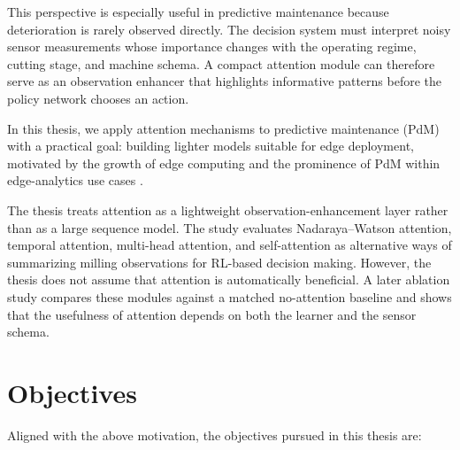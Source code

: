 \documentclass[12pt,oneside]{book}
\begin{document}
This perspective is especially useful in predictive maintenance because deterioration is rarely observed directly. The decision system must interpret noisy sensor measurements whose importance changes with the operating regime, cutting stage, and machine schema. A compact attention module can therefore serve as an observation enhancer that highlights informative patterns before the policy network chooses an action.

In this thesis, we apply attention mechanisms to predictive maintenance (PdM) with a practical goal: building lighter models suitable for edge deployment, motivated by the growth of edge computing and the prominence of PdM within edge-analytics use cases \citep{edgereport2023}.

The thesis treats attention as a lightweight observation-enhancement layer rather than as a large sequence model. The study evaluates Nadaraya--Watson attention, temporal attention, multi-head attention, and self-attention as alternative ways of summarizing milling observations for RL-based decision making. However, the thesis does not assume that attention is automatically beneficial. A later ablation study compares these modules against a matched no-attention baseline and shows that the usefulness of attention depends on both the learner and the sensor schema.

\clearpage
\newpage
\section{Objectives}


Aligned with the above motivation, the objectives pursued in this thesis are:
\end{document}
